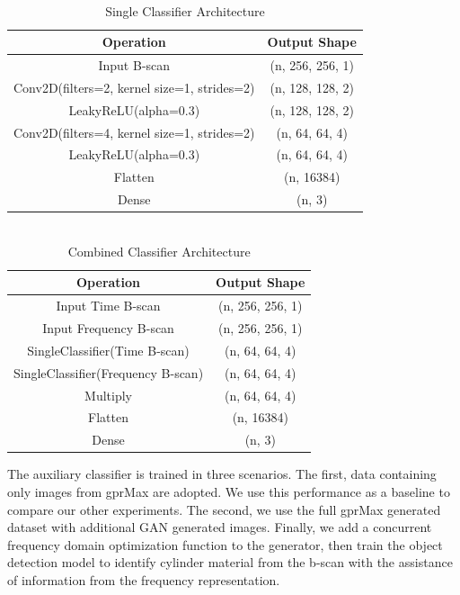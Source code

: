 \begin{center}
    \begin{table}[H]
        \centering
        \singlespacing
        \caption{\\Single Classifier Architecture}
        \begin{tabular}{c|c}
            Operation & Output Shape \\
            \hline
            Input B-scan & (n, 256, 256, 1) \\
            Conv2D(filters=2, kernel size=1, strides=2) & (n, 128, 128, 2)\\
            LeakyReLU(alpha=0.3) & (n, 128, 128, 2) \\
            Conv2D(filters=4, kernel size=1, strides=2) & (n, 64, 64, 4)\\
            LeakyReLU(alpha=0.3) & (n, 64, 64, 4)\\
            Flatten & (n, 16384) \\
            Dense & (n, 3) \\
        \end{tabular}
        \label{tab:single_classifier}
    \end{table}
\end{center}
\begin{center}
    \begin{table}[H]
        \centering
        \caption{\\Combined Classifier Architecture}
        \begin{tabular}{c|c}
            Operation & Output Shape \\
            \hline
            Input Time B-scan & (n, 256, 256, 1)\\
            Input Frequency B-scan & (n, 256, 256, 1)\\
            SingleClassifier(Time B-scan) & (n, 64, 64, 4)\\
            SingleClassifier(Frequency B-scan) & (n, 64, 64, 4)\\
            Multiply & (n, 64, 64, 4)\\
            Flatten & (n, 16384) \\
            Dense & (n, 3) \\
        \end{tabular}
        \label{tab:combined_classifier}
    \end{table}
\end{center}

\hspace{0.5in}The auxiliary classifier is trained in three scenarios. The first, data containing only images from gprMax are adopted. We use this performance as a baseline to compare our other experiments. The second, we use the full gprMax generated dataset with additional GAN generated images. Finally, we add a concurrent frequency domain optimization function to the generator, then train the object detection model to identify cylinder material from the b-scan with the assistance of information from the frequency representation.